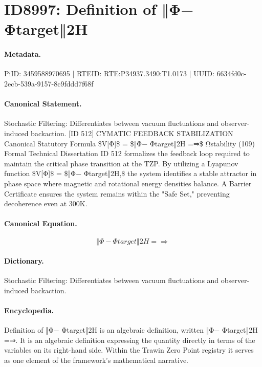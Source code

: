 \section*{ID8997: Definition of ‖Φ− Φtarget‖2H}
\paragraph{Metadata.}
PiID: 3459588970695 | RTEID: RTE:P34937.3490:T1.0173 | UUID: 6634fd0c-2ecb-539a-9157-8c9fddd7f68f

\paragraph{Canonical Statement.}
Stochastic Filtering: Differentiates between vacuum fluctuations and observer-induced backaction. [ID 512] CYMATIC FEEDBACK STABILIZATION Canonical Statutory Formula \$V[Φ]\$ = \$‖Φ− Φtarget‖2H =⇒\$ Ωstability (109) Formal Technical Dissertation ID 512 formalizes the feedback loop required to maintain the critical phase transition at the TZP. By utilizing a Lyapunov function \$V[Φ]\$ = \$‖Φ− Φtarget‖2H,\$ the system identifies a stable attractor in phase space where magnetic and rotational energy densities balance. A Barrier Certificate ensures the system remains within the "Safe Set," preventing decoherence even at 300K.

\paragraph{Canonical Equation.}
\[
‖Φ− Φtarget‖2H =⇒
\]

\paragraph{Dictionary.}
Stochastic Filtering: Differentiates between vacuum fluctuations and observer-induced backaction.

\paragraph{Encyclopedia.}
Definition of ‖Φ− Φtarget‖2H is an algebraic definition, written ‖Φ− Φtarget‖2H =⇒. It is an algebraic definition expressing the quantity directly in terms of the variables on its right-hand side. Within the Trawin Zero Point registry it serves as one element of the framework's mathematical narrative.
